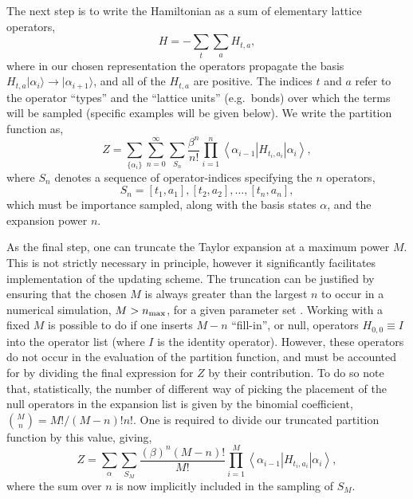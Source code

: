 \documentclass[vecphys]{svmult}
\begin{document}
The next step is to write the Hamiltonian as a sum of elementary lattice operators,
\begin{equation}
H=-\sum_t \sum_a H_{t,a}, \label{Hdecomp}
\label{Hsum}
\end{equation}
where in our chosen representation the operators propagate the basis $H_{t,a} |\alpha_i \rangle \rightarrow | \alpha_{i+1} \rangle$, and all of the $H_{t,a}$ are positive.  The indices $t$ and $a$ refer to the operator ``types'' and the ``lattice units'' (e.g.~bonds) over which the terms will be sampled (specific examples will be given below).  We write the partition function as, 
\begin{equation}
Z=\sum_{ \{ \alpha_i \} } \sum_{n=0}^{\infty} \sum_{S_n} \frac{ \beta^n}{n !}
 \prod_{i=1}^{n}  \left\langle{\alpha_{i-1}  \left|  {H_{t_i,a_i}}  \right| \alpha_i   }\right\rangle,
 \label{Zsse2b}
\end{equation}
where $S_n$ denotes a sequence of operator-indices specifying the $n$ operators,
\begin{equation}
S_n = [t_1,a_1],[t_2,a_2], \ldots ,[t_n,a_n],
\end{equation}
which must be importance sampled, along with the basis states $\alpha$, and the expansion power $n$.   

As the final step, one can truncate the Taylor expansion at a maximum power $M$.  This is not strictly necessary in principle, however it significantly facilitates implementation of the updating scheme.  The truncation can be justified 
by ensuring that the chosen $M$ is always greater than the largest $n$ to occur in a numerical simulation, $M>n_{\rm max}$, for a given parameter set \cite{Melko:SandvikHeis}.  
Working with a fixed $M$ is possible to do if one inserts $M-n$ ``fill-in'', or null, operators $H_{0,0} \equiv I$ into the operator list (where $I$ is the identity operator).  However, these operators do not occur in the evaluation of the partition function, and must be accounted for by dividing the final expression for $Z$ by their contribution.  To do so note that, statistically, the number of different way of picking the placement of the null operators in the expansion list is given by the binomial coefficient,
${M \choose n}= M!/(M-n)!n!$.  One is required to divide our truncated partition function by this value, giving,
\begin{equation}Z=\sum_{\alpha} \sum_{S_M} \frac{ (\beta)^n (M-n)!}{M !}  %
 \prod_{i=1}^{M}  \left\langle{\alpha_{i-1}  \left|  {H_{t_i,a_i}}  \right| \alpha_i   }\right\rangle,
 \label{Zsse3}
\end{equation}
where the sum over $n$ is now implicitly included in the sampling of $S_M$.
\end{document}
